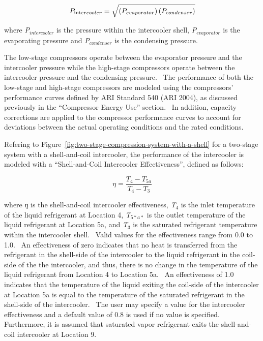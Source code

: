 \begin{equation}
{P_{{\mathop{\rm int}} ercooler}} = \sqrt {\left( {{P_{evaporator}}} \right)\left( {{P_{condenser}}} \right)}
\end{equation}

where \emph{P\(_{intercooler}\)} is the pressure within the intercooler shell, \emph{P\(_{evaporator}\)} is the evaporating pressure and \emph{P\(_{condenser}\)} is the condensing pressure.

The low-stage compressors operate between the evaporator pressure and the intercooler pressure while the high-stage compressors operate between the intercooler pressure and the condensing pressure.~ The performance of both the low-stage and high-stage compressors are modeled using the compressors' performance curves defined by ARI Standard 540 (ARI 2004), as discussed previously in the ``Compressor Energy Use'' section.~ In addition, capacity corrections are applied to the compressor performance curves to account for deviations between the actual operating conditions and the rated conditions.

Refering to Figure~\ref{fig:two-stage-compression-system-with-a-shell} for a two-stage system with a shell-and-coil intercooler, the performance of the intercooler is modeled with a ``Shell-and-Coil Intercooler Effectiveness'', defined as follows:

\begin{equation}
\eta  = \frac{{{T_4} - {T_{5a}}}}{{{T_4} - {T_3}}}
\end{equation}

where \emph{η} is the shell-and-coil intercooler effectiveness, \emph{T}\(_{4}\) is the inlet temperature of the liquid refrigerant at Location 4, \emph{T}\(_{5*a*}\) is the outlet temperature of the liquid refrigerant at Location 5a, and \emph{T}\(_{3}\) is the saturated refrigerant temperature within the intercooler shell.~ Valid values for the effectiveness range from 0.0 to 1.0.~ An effectiveness of zero indicates that no heat is transferred from the refrigerant in the shell-side of the intercooler to the liquid refrigerant in the coil-side of the the intercooler, and thus, there is no change in the temperature of the liquid refrigerant from Location 4 to Location 5a.~ An effectiveness of 1.0 indicates that the temperature of the liquid exiting the coil-side of the intercooler at Location 5a is equal to the temperature of the saturated refrigerant in the shell-side of the intercooler.~ The user may specify a value for the intercooler effectiveness and a default value of 0.8 is used if no value is specified.~ Furthermore, it is assumed that saturated vapor refrigerant exits the shell-and-coil intercooler at Location 9.

